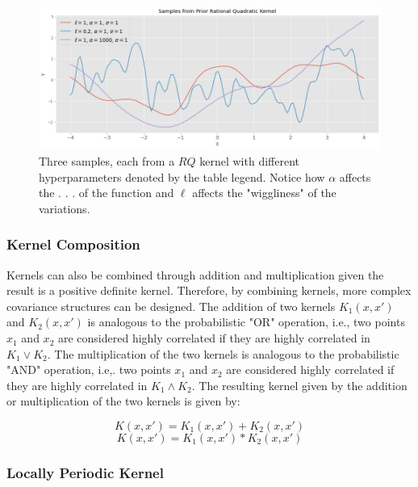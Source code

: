 \begin{figure}[htp]
\centering
\graphicspath{ {./images/} }
\includegraphics[scale=0.49]{images/samples_rq_prior.png}
\caption{Three samples, each from a $RQ$ kernel with different hyperparameters denoted by the table legend. Notice how $\alpha$ affects the . . . of the function and $\ell$ affects the "wiggliness" of the variations.}
\end{figure}

\subsubsection{Kernel Composition}

Kernels can also be combined through addition and multiplication given the result is a positive definite kernel. Therefore, by combining kernels, more complex covariance structures can be designed. The addition of two kernels $K_1(x, x')$ and $K_2(x, x')$ is analogous to the probabilistic "OR" operation, i.e., two points $x_1$ and $x_2$ are considered highly correlated if they are highly correlated in $K_1 \lor K_2$. The multiplication of the two kernels is analogous to the probabilistic "AND" operation, i.e,. two points $x_1$ and $x_2$ are considered highly correlated if they are highly correlated in $K_1 \land K_2$. The resulting kernel given by the addition or multiplication of the two kernels is given by:

\begin{equation}
    K(x, x') = K_1(x, x') + K_2(x, x')
\end{equation}
\begin{equation}
    K(x, x') = K_1(x, x') * K_2(x, x')
\end{equation}

\subsubsection{Locally Periodic Kernel}

